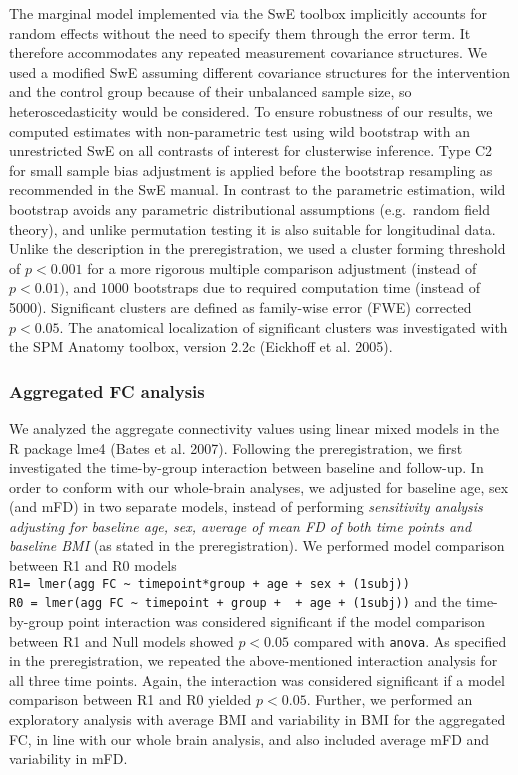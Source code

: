 \documentclass[
]{article}
\begin{document}
The marginal model implemented via the SwE toolbox implicitly accounts for random effects without the need to specify them through the error term. It therefore accommodates any repeated measurement covariance structures. We used a modified SwE assuming different covariance structures for the intervention and the control group because of their unbalanced sample size, so heteroscedasticity would be considered.
To ensure robustness of our results, we computed estimates with non-parametric test using wild bootstrap with an unrestricted SwE on all contrasts of interest for clusterwise inference.
Type C2 for small sample bias adjustment is applied before the bootstrap resampling as recommended in the SwE manual.
In contrast to the parametric estimation, wild bootstrap avoids any parametric distributional assumptions (e.g.~random field theory), and unlike permutation testing it is also suitable for longitudinal data.
Unlike the description in the preregistration, we used a cluster forming threshold of \(p < 0.001\) for a more rigorous multiple comparison adjustment (instead of \(p < 0.01)\), and \(1000\) bootstraps due to required computation time (instead of 5000). Significant clusters are defined as family-wise error (FWE) corrected \(p < 0.05\). The anatomical localization of significant clusters was investigated with the SPM Anatomy toolbox, version 2.2c (Eickhoff et al. 2005).

\hypertarget{aggregated-fc-analysis}{%
\subsubsection{Aggregated FC analysis}\label{aggregated-fc-analysis}}

We analyzed the aggregate connectivity values using linear mixed models in the R package lme4 (Bates et al. 2007).
Following the preregistration, we first investigated the time-by-group interaction between baseline and follow-up. In order to conform with our whole-brain analyses, we adjusted for baseline age, sex (and mFD) in two separate models, instead of performing \emph{sensitivity analysis adjusting for baseline age, sex, average of mean FD of both time points and baseline BMI} (as stated in the preregistration).
We performed model comparison between R1 and R0 models
\texttt{R1=\ lmer(agg\ FC\ \textasciitilde{}\ timepoint*group\ +\ age\ +\ sex\ +\ (1\textbar{}subj))}
\texttt{R0\ =\ lmer(agg\ FC\ \textasciitilde{}\ timepoint\ +\ group\ +\ \ +\ age\ +\ (1\textbar{}subj))}
and the time-by-group point interaction was considered significant if the model comparison between R1 and Null models showed \(p < 0.05\) compared with \texttt{anova}.
As specified in the preregistration, we repeated the above-mentioned interaction analysis for all three time points. Again, the interaction was considered significant if a model comparison between R1 and R0 yielded \(p < 0.05\).
Further, we performed an exploratory analysis with average BMI and variability in BMI for the aggregated FC, in line with our whole brain analysis, and also included average mFD and variability in mFD.
\end{document}
